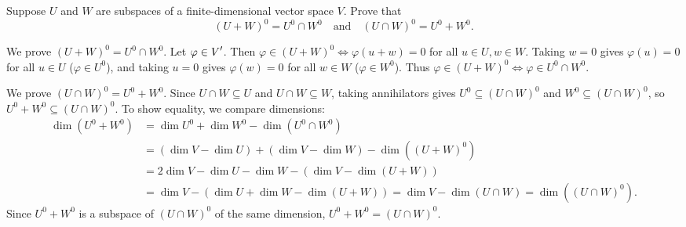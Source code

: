 \begin{xrcs}
  Suppose $U$ and $W$ are subspaces of a finite-dimensional vector space $V$. Prove that
  \begin{equation}
    (U + W)^0 = U^0 \cap W^0 \quad \text{and} \quad (U \cap W)^0 = U^0 + W^0.
  \end{equation}
\begin{xprf}
  \StepOne We prove $(U+W)^0 = U^0 \cap W^0$.
  Let $\varphi \in \displaystyle V'$. Then $\varphi \in (U+W)^0 \iff \varphi(u+w) = 0$ for all $u \in U, w \in W$.
  Taking $w = 0$ gives $\varphi(u) = 0$ for all $u \in U$ ($\varphi \in U^0$), and taking $u = 0$ gives $\varphi(w) = 0$ for all $w \in W$ ($\varphi \in W^0$).
  Thus $\varphi \in (U+W)^0 \iff \varphi \in U^0 \cap W^0$.

  \StepTwo We prove $(U \cap W)^0 = U^0 + W^0$.
  Since $U \cap W \subseteq U$ and $U \cap W \subseteq W$, taking annihilators gives $U^0 \subseteq (U \cap W)^0$ and $W^0 \subseteq (U \cap W)^0$, so $U^0 + W^0 \subseteq (U \cap W)^0$.
  To show equality, we compare dimensions:
  \[
  \begin{aligned}
    \dim(U^0 + W^0) &= \dim U^0 + \dim W^0 - \dim(U^0 \cap W^0) \\
    &= (\dim V - \dim U) + (\dim V - \dim W) - \dim((U+W)^0) \\
    &= 2\dim V - \dim U - \dim W - (\dim V - \dim(U+W)) \\
    &= \dim V - (\dim U + \dim W - \dim(U+W)) = \dim V - \dim(U \cap W) = \dim((U \cap W)^0).
  \end{aligned}
  \]
  Since $U^0 + W^0$ is a subspace of $(U \cap W)^0$ of the same dimension, $U^0 + W^0 = (U \cap W)^0$.
\end{xprf}
\end{xrcs}